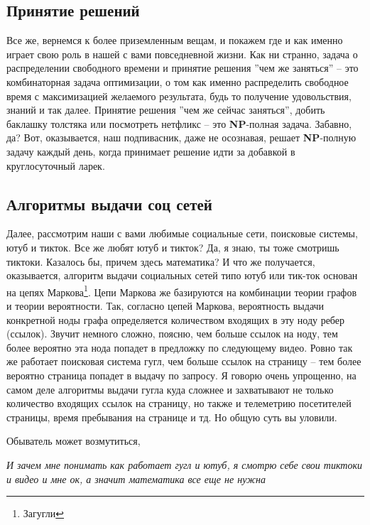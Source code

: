 \subsection{Принятие решений}\label{subsec:decision-making}
Все же, вернемся к более приземленным вещам, и покажем где и как именно играет свою роль в нашей с вами повседневной жизни.
Как ни странно, задача о распределении свободного времени и принятие решения ''чем же заняться'' -- это комбинаторная задача оптимизации,
о том как именно распределить свободное время с максимизацией желаемого результата,
будь то получение удовольствия, знаний и так далее.
Принятие решения ''чем же сейчас заняться'', добить баклашку толстяка или посмотреть нетфликс -- это \textbf{NP}-полная задача.
Забавно, да?
Вот, оказывается, наш подпивасник, даже не осознавая, решает \textbf{NP}-полную задачу каждый день,
когда принимает решение идти за добавкой в круглосуточный ларек.

\subsection{Алгоритмы выдачи соц сетей}\label{subsec:social-media}

Далее, рассмотрим наши с вами любимые социальные сети, поисковые системы, ютуб и тикток.
Все же любят ютуб и тикток?
Да, я знаю, ты тоже смотришь тиктоки.
Казалось бы, причем здесь математика?
И что же получается, оказывается, алгоритм выдачи социальных сетей типо ютуб или тик-ток основан на
цепях Маркова\footnote{Загугли}.
Цепи Маркова же базируются на комбинации теории графов и теории вероятности.
Так, согласно цепей Маркова, вероятность выдачи конкретной ноды графа определяется количеством входящих в эту
ноду ребер (ссылок).
Звучит немного сложно, поясню, чем больше ссылок на ноду, тем более вероятно эта нода попадет в предложку по следующему видео.
Ровно так же работает поисковая система гугл, чем больше ссылок на страницу -- тем более вероятно страница попадет в выдачу
по запросу.
Я говорю очень упрощенно, на самом деле алгоритмы выдачи гугла куда сложнее и захватывают
не только количество входящих ссылок на страницу, но также и телеметрию посетителей страницы,
время пребывания на странице и тд.
Но общую суть вы уловили.

Обыватель может возмутиться,

\begin{displayquote}
    \textit{
        И зачем мне понимать как работает гугл и ютуб, я смотрю себе свои тиктоки и видео и мне ок, а значит математика все еще не нужна
    }
\end{displayquote}

